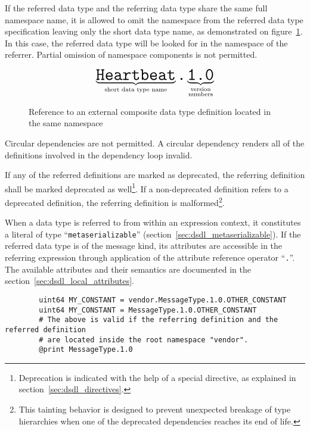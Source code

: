 If the referred data type and the referring data type share the same full namespace name,
it is allowed to omit the namespace from the referred data type specification
leaving only the short data type name, as demonstrated on figure~\ref{fig:dsdl_nested_reference_short}.
In this case, the referred data type will be looked for in the namespace of the referrer.
Partial omission of namespace components is not permitted.

\begin{figure}[H]
    $$
    \underbrace{\texttt{\huge{Heartbeat}}}_{\text{short data type name}}%
    \texttt{\huge{.}}%
    \underbrace{\texttt{\huge{1.0}}}_{\substack{\text{version} \\ \text{numbers}}}%
    $$
    \caption{Reference to an external composite data type definition located in the same namespace
             \label{fig:dsdl_nested_reference_short}}
\end{figure}

Circular dependencies are not permitted.
A circular dependency renders all of the definitions involved in the dependency loop invalid.

If any of the referred definitions are marked as deprecated,
the referring definition shall be marked deprecated as well\footnote{%
    Deprecation is indicated with the help of a special directive, as explained in section~\ref{sec:dsdl_directives}.
}.
If a non-deprecated definition refers to a deprecated definition,
the referring definition is malformed\footnote{%
    This tainting behavior is designed to prevent unexpected breakage of
    type hierarchies when one of the deprecated dependencies reaches its end of life.
}.

When a data type is referred to from within an expression context,
it constitutes a literal of type ``\verb|metaserializable|'' (section~\ref{sec:dsdl_metaserializable}).
If the referred data type is of the message kind,
its attributes are accessible in the referring expression through application of the
attribute reference operator ``\verb|.|''.
The available attributes and their semantics are documented in the section~\ref{sec:dsdl_local_attributes}.

\begin{remark}
    \begin{verbatim}
        uint64 MY_CONSTANT = vendor.MessageType.1.0.OTHER_CONSTANT
        uint64 MY_CONSTANT = MessageType.1.0.OTHER_CONSTANT
        # The above is valid if the referring definition and the referred definition
        # are located inside the root namespace "vendor".
        @print MessageType.1.0
    \end{verbatim}
\end{remark}

